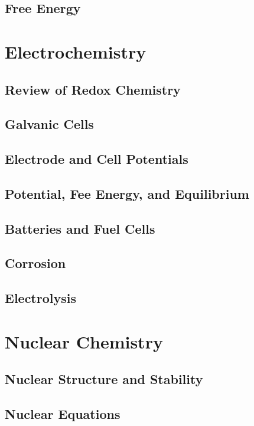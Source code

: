 \documentclass[12pt, openany, letterpaper]{memoir}
\begin{document}
\section{Free Energy}

\chapter{Electrochemistry}

\section{Review of Redox Chemistry}

\section{Galvanic Cells}

\section{Electrode and Cell Potentials}

\section{Potential, Fee Energy, and Equilibrium}

\section{Batteries and Fuel Cells}

\section{Corrosion}

\section{Electrolysis}

\setcounter{chapter}{20}
\chapter{Nuclear Chemistry}

\section{Nuclear Structure and Stability}

\section{Nuclear Equations}
\end{document}
